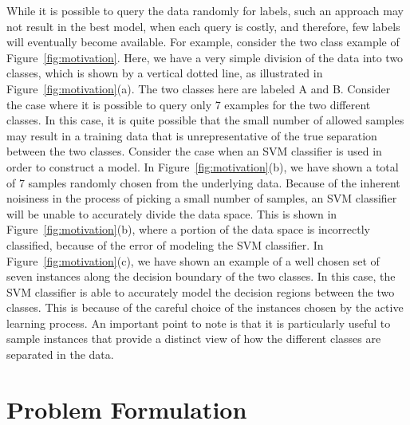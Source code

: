 \documentclass{acmtog}
\begin{document}
While it is possible to query the data randomly for labels, such an approach may not result in the best model, when each query is costly, and therefore, few labels will eventually become available. For example, consider the two class example of Figure~\ref{fig:motivation}. Here, we have a very simple division of the data into two classes, which is shown by a vertical dotted line, as illustrated in Figure~\ref{fig:motivation}(a). The two classes here are labeled A and B. Consider the case where it is possible to query only 7 examples for the two different classes. In this case, it is quite possible that the small number of allowed samples may result in a training data that is unrepresentative of the true separation between the two classes. Consider the case when an SVM classifier is used in order to construct a model. In Figure~\ref{fig:motivation}(b), we have shown a total of 7 samples randomly chosen from the underlying data. Because of the inherent noisiness in the process of picking a small number of samples, an SVM classifier will be unable to accurately divide the data space. This is shown in Figure~\ref{fig:motivation}(b), where a portion of the data space is incorrectly classified, because of the error of modeling the SVM classifier. In Figure~\ref{fig:motivation}(c), we have shown an example of a well chosen set of seven instances along the decision boundary of the two classes. In this case, the SVM classifier is able to accurately model the decision regions between the two classes. This is because of the careful choice of the instances chosen by the active learning process. An important point to note is that it is particularly useful to sample instances that provide a distinct view of how the different classes are separated in the data.

\section{Problem Formulation}
\label{sub:problem_formulation}
\end{document}
